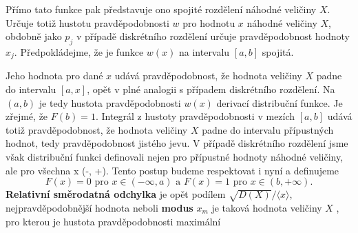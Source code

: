       
      Přímo tato funkce pak představuje ono spojité rozdělení náhodné veličiny \(X\). Určuje totiž
      hustotu pravděpodobnosti \(w\) pro hodnotu \(x\) náhodné veličiny \(X\), obdobně jako \(p_j\) 
      v případě diskrétního rozdělení určuje pravděpodobnost hodnoty \(x_j\). Předpokládejme, že je 
      funkce \(w(x)\) na intervalu \([a, b]\) spojitá.
  
      Jeho hodnota pro dané \(x\) udává pravděpodobnost, že hodnota veličiny \(X\) padne do 
      intervalu \([a, x]\), opět v plné analogii s případem diskrétního rozdělení. Na \((a, b)\) je 
      tedy hustota pravděpodobnosti \(w(x)\) derivací distribuční funkce. Je zřejmé, že \(F(b) = 
      1\). Integrál z hustoty pravděpodobnosti v mezích \([a, b]\) udává totiž pravděpodobnost, že 
      hodnota veličiny \(X\) padne do intervalu přípustných hodnot, tedy pravděpodobnost jistého 
      jevu. V případě diskrétního rozdělení jsme však distribuční funkci definovali nejen pro 
      přípustné hodnoty náhodné veličiny, ale pro všechna x \in (-\infty, +\infty). Tento postup 
      budeme respektovat i nyní a definujeme
      \begin{equation*}
        F(x) = 0\text{ pro }x \in (-\infty,a)\text{ a }F(x) = 1\text{ pro }x \in (b , +\infty).
      \end{equation*}
      \textbf{Relativní směrodatná odchylka} je opět podílem \(\sqrt{D(X)}/\langle x \rangle\), 
      nejpravděpodobnější hodnota neboli \textbf{modus} \(x_m\) je taková hodnota veličiny \(X\) , 
      pro kterou je hustota pravděpodobnosti maximální
      
